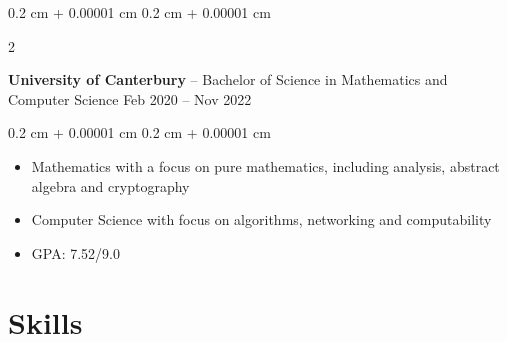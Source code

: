 \documentclass[10pt, letterpaper]{article}
\newenvironment{highlights}{
    \begin{itemize}[
        topsep=0.10 cm,
        parsep=0.10 cm,
        partopsep=0pt,
        itemsep=0pt,
        leftmargin=0.4 cm + 10pt
    ]
}{
    \end{itemize}
} %
\newenvironment{onecolentry}{
    \begin{adjustwidth}{
        0.2 cm + 0.00001 cm
    }{
        0.2 cm + 0.00001 cm
    }
}{
    \end{adjustwidth}
} %
\newenvironment{twocolentry}[2][]{
    \onecolentry
    \def\secondColumn{#2}
    \setcolumnwidth{\fill, 4.5 cm}
    \begin{paracol}{2}
}{
    \switchcolumn \raggedleft \secondColumn
    \end{paracol}
    \endonecolentry
} %
\begin{document}
\vspace{0.2 cm}

\begin{twocolentry}{
        Feb 2020 -- Nov 2022
    }
    \textbf{University of Canterbury} -- Bachelor of Science in Mathematics and Computer Science\end{twocolentry}

\vspace{0.10 cm}
\begin{onecolentry}
    \begin{highlights}
        \item Mathematics with a focus on pure mathematics, including analysis, abstract algebra and cryptography
        \item Computer Science with focus on algorithms, networking and computability
        \item GPA: 7.52/9.0
    \end{highlights}
\end{onecolentry}

\section{Skills}



\end{document}

